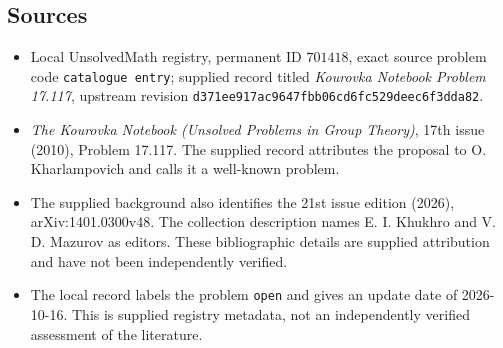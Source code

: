 \documentclass[11pt]{article}
\begin{document}
\subsection{Sources}
\begin{itemize}
\item Local UnsolvedMath registry, permanent ID \(701418\), exact source problem code \texttt{catalogue entry}; supplied record titled \emph{Kourovka Notebook Problem 17.117}, upstream revision \texttt{d371ee917ac9647fbb06cd6fc529deec6f3dda82}.
\item \emph{The Kourovka Notebook (Unsolved Problems in Group Theory)}, 17th issue (2010), Problem 17.117. The supplied record attributes the proposal to O. Kharlampovich and calls it a well-known problem.
\item The supplied background also identifies the 21st issue edition (2026), arXiv:1401.0300v48. The collection description names E. I. Khukhro and V. D. Mazurov as editors. These bibliographic details are supplied attribution and have not been independently verified.
\item The local record labels the problem \texttt{open} and gives an update date of 2026-10-16. This is supplied registry metadata, not an independently verified assessment of the literature.
\end{itemize}
\end{document}
